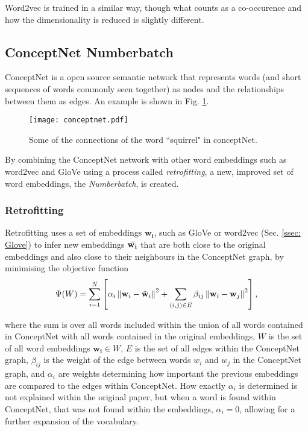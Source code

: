         Word2vec is trained in a similar way, though what counts as a co-occurence and how the dimensionality is reduced is slightly different.
        
    \subsection{ConceptNet Numberbatch \label{ssec: Numberbatch}}
        
        ConceptNet is a open source semantic network that represents words (and short sequences of words commonly seen together) as nodes and the relationships between them as edges. An example is shown in Fig. \ref{fig: conceptnet}.
           \begin{figure}[h]
                \centering
                 \captionsetup{format=hang}
                \texttt{[image: conceptnet.pdf]}
                \caption{Some of the connections of the word ``squirrel" in conceptNet. \label{fig: conceptnet}}
            \end{figure}
        
        By combining the ConceptNet network with other word embeddings such as word2vec and GloVe using a process called \textit{retrofitting}, a new, improved set of word embeddings, the \textit{Numberbatch}, is created.
        
        \subsubsection{Retrofitting}
            Retrofitting uses a set of embeddings $\mathbf{w_i}$, such as GloVe or word2vec (Sec. \ref{ssec: Glove}) to infer new embeddings $\Tilde{\mathbf{w_i}}$ that are both close to the original embeddings and also close to their neighbours in the ConceptNet graph, by minimising the objective function 
            \begin{equation}
                \Psi(W)=\sum_{i=1}^{N}\left[\alpha_{i}\left\|\mathbf{w}_{i}-\Tilde{\mathbf{w}}_{i}\right\|^{2}+\sum_{(i, j) \in E} \beta_{i j}\left\|\mathbf{w}_{i}-\mathbf{w}_{j}\right\|^{2}\right],
            \end{equation}
            
            where the sum is over all words included within the union of all words contained in ConceptNet with all words contained in the original embeddings, $W$ is the set of all word embeddings $\mathbf{w_i} \in W$, $E$ is the set of all edges within the ConceptNet graph, $\beta_{ij}$ is the weight of the edge between words $w_i$ and $w_j$ in the ConceptNet graph, and $\alpha_i$ are weights determining how important the previous embeddings are compared to the edges within ConceptNet. How exactly $\alpha_i$ is determined is not explained within the original paper, but when a word is found within ConceptNet, that was not found within the embeddings, $\alpha_i = 0$, allowing for a further expansion of the vocabulary.\cite{speer2017conceptnet}
        
